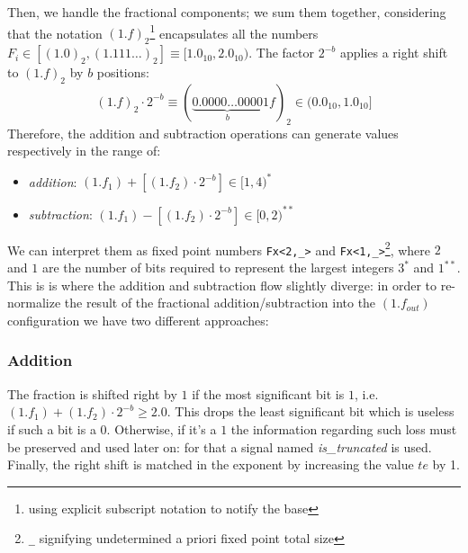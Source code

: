Then, we handle the fractional components; we sum them together, considering that the notation $(1.f)_2$\footnote{using explicit subscript notation to notify the base} encapsulates all the numbers $F_i \in [(1.0)_2, (1.111\dots)_2 ] \equiv [1.0_{10},  2.0_{10})$.
The factor $2^{-b}$ applies a right shift to $(1.f)_2$ by $b$ positions:
$$
(1.f)_2 \cdot 2^{-b} \equiv (\underbrace{0.0000\dots0000}_{b}1f)_2 \in (0.0_{10}, 1.0_{10}]
$$
Therefore, the addition and subtraction operations can generate values respectively in the range of:
\begin{itemize}
    \item \textit{addition}: $(1.f_1) + [(1.f_2) \cdot 2^{-b}] \in [1, 4)^{*}$
    \item \textit{subtraction}: $(1.f_1) - [(1.f_2) \cdot 2^{-b}] \in [0, 2)^{**}$
\end{itemize}
We can interpret them as fixed point numbers \texttt{Fx<2,\_>} and \texttt{Fx<1,\_>}\footnote{\texttt{\_} signifying undetermined a priori fixed point total size}, where $2$ and $1$ are the number of bits required to represent the largest integers $3^{*}$ and $1^{**}$.
This is is where the addition and subtraction flow slightly diverge: in order to re-normalize the result of the fractional addition/subtraction into the $(1.f_{out})$ configuration we have two different approaches:

    \subsubsection{Addition}
    The fraction is shifted right by $1$ if the most significant bit is $1$, i.e. $(1.f_1) + (1.f_2) \cdot 2^{-b} \ge 2.0$. 
    This drops the least significant bit which is useless if such a bit is a $0$. Otherwise, if it's a $1$ the information regarding such loss must be preserved and used later on: for that a signal named \textit{is\_truncated} is used. Finally, the right shift is matched in the exponent by increasing the value $te$ by 1.
